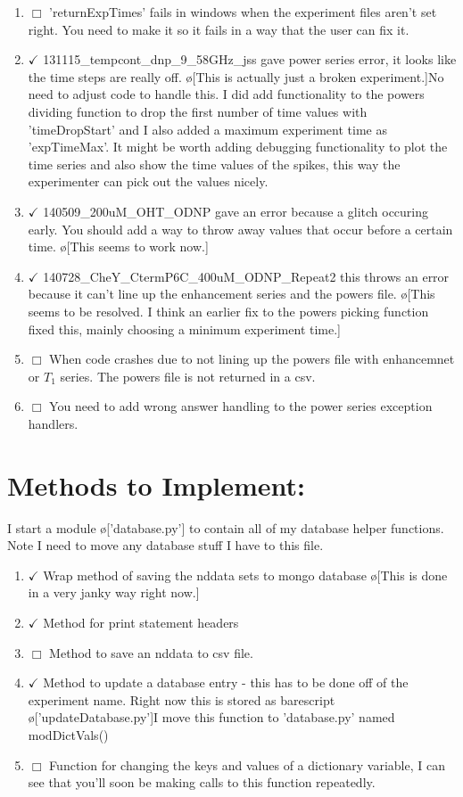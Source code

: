 \documentclass[10pt]{book}
\begin{document}
\begin{enumerate}
    \item $\Box$ 'returnExpTimes' fails in windows when the experiment files aren't set right. You need to make it so it fails in a way that the user can fix it.
    \item $\checkmark$ 131115_tempcont_dnp_9_58GHz_jss gave power series error, it looks like the time steps are really off. \o[This is actually just a broken experiment.]{No need to adjust code to handle this. I did add functionality to the powers dividing function to drop the first number of time values with 'timeDropStart' and I also added a maximum experiment time as 'expTimeMax'. It might be worth adding debugging functionality to plot the time series and also show the time values of the spikes, this way the experimenter can pick out the values nicely.}
    \item $\checkmark$ 140509_200uM_OHT_ODNP gave an error because a glitch occuring early. You should add a way to throw away values that occur before a certain time. \o[This seems to work now.]{}
    \item $\checkmark$ 140728_CheY_CtermP6C_400uM_ODNP_Repeat2 this throws an error because it can't line up the enhancement series and the powers file. \o[This seems to be resolved. I think an earlier fix to the powers picking function fixed this, mainly choosing a minimum experiment time.]{}
    \item $\Box$ When code crashes due to not lining up the powers file with enhancemnet or $T_1$ series. The powers file is not returned in a csv.
    \item $\Box$ You need to add wrong answer handling to the power series exception handlers.
\end{enumerate}
\section{Methods to Implement:}
I start a module \o['database.py']{} to contain all of my database helper functions. Note I need to move any database stuff I have to this file.

\begin{enumerate}
    \item $\checkmark$ Wrap method of saving the nddata sets to mongo database \o[This is done in a very janky way right now.]{}
    \item $\checkmark$ Method for print statement headers
    \item $\Box$ Method to save an nddata to csv file.
    \item $\checkmark$ Method to update a database entry - this has to be done off of the experiment name. Right now this is stored as barescript \o['updateDatabase.py']{I move this function to 'database.py' named modDictVals()}
    \item $\Box$ Function for changing the keys and values of a dictionary variable, I can see that you'll soon be making calls to this function repeatedly.
\end{enumerate}
\end{document}
